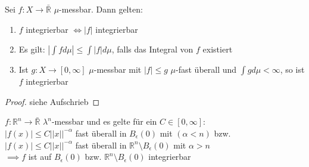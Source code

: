   \newpage
  \begin{theorem}
    Sei $f: X \to \bar{\mathbb{R}}$ $\mu$-messbar. Dann gelten:
    \begin{enumerate}[label=\roman*)]
      \item $f$ integrierbar $\Leftrightarrow |f|$ integrierbar
      \item Es gilt: $|\int f d\mu| \leq \int |f| d\mu$, falls das Integral von $f$ existiert
      \item Ist $g: X \to [0, \infty]$ $\mu$-messbar mit $|f| \leq g$ $\mu$-fast überall und $\int g d\mu < \infty$, so ist $f$ integrierbar 
    \end{enumerate}
  \end{theorem}

  \begin{proof}
    siehe Aufschrieb
  \end{proof}

  \begin{example}
    $f: \mathbb{R}^n \to \bar{\mathbb{R}}$ $\lambda^n$-messbar und es gelte für ein $C \in [0, \infty]$:\\
    $|f(x)| \leq C ||x||^{-\alpha}$ fast überall in $B_{\epsilon}(0)$ mit $(\alpha < n)$ bzw.\\
    $|f(x)| \leq C ||x||^{-\alpha}$ fast überall in $\mathbb{R}^n \setminus B_{\epsilon}(0)$ mit $\alpha > n$\\
    $\implies f$ ist auf $B_{\epsilon}(0)$ bzw. $\mathbb{R}^n \setminus B_{\epsilon}(0)$ integrierbar
  \end{example}

  